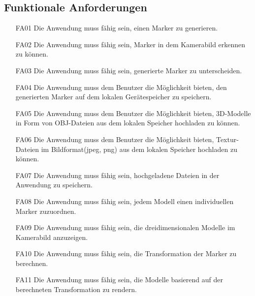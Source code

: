 \subsection{Funktionale Anforderungen}
\begin{itemize}
\item[FA01] Die Anwendung muss fähig sein, einen Marker zu generieren.
\item[FA02] Die Anwendung muss fähig sein, Marker in dem Kamerabild erkennen zu können.
\item[FA03] Die Anwendung muss fähig sein, generierte Marker zu unterscheiden.
\item[FA04] Die Anwendung muss dem Benutzer die Möglichkeit bieten, den generierten Marker auf dem lokalen Gerätespeicher zu speichern.
\item[FA05] Die Anwendung muss dem Benutzer die Möglichkeit bieten, 3D-Modelle in Form von OBJ-Dateien aus dem lokalen Speicher hochladen zu können.
\item[FA06] Die Anwendung muss dem Benutzer die Möglichkeit bieten, Textur-Dateien im Bildformat(jpeg, png) aus dem lokalen Speicher hochladen zu können.
\item[FA07] Die Anwendung muss fähig sein, hochgeladene Dateien in der Anwendung zu speichern.
\item[FA08] Die Anwendung muss fähig sein, jedem Modell einen individuellen Marker zuzuordnen.
\item[FA09] Die Anwendung muss fähig sein, die dreidimensionalen Modelle im Kamerabild anzuzeigen.
\item[FA10] Die Anwendung muss fähig sein, die Transformation der Marker zu berechnen.
\item[FA11] Die Anwendung muss fähig sein, die Modelle basierend auf der berechneten Transformation zu rendern.
\end{itemize}

